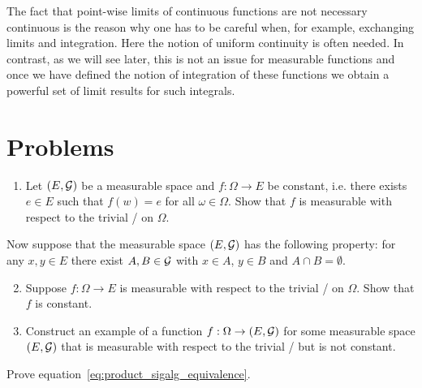 The fact that point-wise limits of continuous functions are not necessary continuous is the reason why one has to be careful when, for example, exchanging limits and integration. Here the notion of uniform continuity is often needed. In contrast, as we will see later, this is not an issue for measurable functions and once we have defined the notion of integration of these functions we obtain a powerful set of limit results for such integrals.




\section{Problems}

\begin{problem}
\hfil
\begin{enumerate}[label=(\alph*)]
\item Let $(E, \mathcal G)$ be a measurable space and $f : \Omega \to E$ be constant, i.e. there exists $e \in E$ such that $f(w) = e$ for all $\omega \in \Omega$. Show that $f$ is measurable with respect to the trivial \sigalg/ on $\Omega$.  
\end{enumerate}

Now suppose that the measurable space $(E, \mathcal G)$ has the following property: for any $x,y\in E$ there exist $A, B \in \mathcal G$ with $x \in A$, $y \in B$ and $A \cap B = \emptyset$.

\begin{enumerate}
\setcounter{enumi}{1}
\item Suppose $f : \Omega \to E$ is measurable with respect to the trivial \sigalg/ on $\Omega$. Show that $f$ is constant.
\item Construct an example of a function $f : \Omega \to (E,\mathcal G)$ for some measurable space $(E, \mathcal G)$ that is measurable with respect to the trivial \sigalg/ but is not constant.
\end{enumerate}
\end{problem}

\begin{problem}\label{prb:product_sigalg_equivalence}
Prove equation~\eqref{eq:product_sigalg_equivalence}.
\end{problem}


